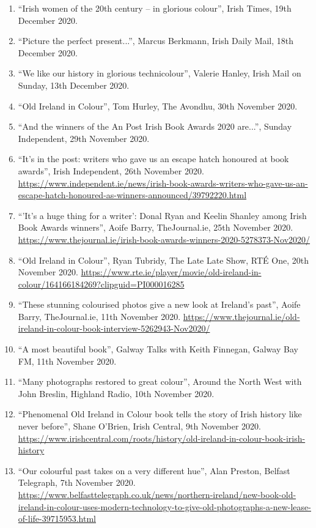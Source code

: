 \documentclass[10pt,a4paper]{res} %
\begin{document}
\begin{resume}
{\begin{enumerate}
\item ``Irish women of the 20th century – in glorious colour'', Irish Times, 19th December 2020.
\item ``Picture the perfect present...'', Marcus Berkmann, Irish Daily Mail, 18th December 2020.
\item ``We like our history in glorious technicolour'', Valerie Hanley, Irish Mail on Sunday, 13th December 2020.
\item ``Old Ireland in Colour'', Tom Hurley, The Avondhu, 30th November 2020.
\item ``And the winners of the An Post Irish Book Awards 2020 are...'', Sunday Independent, 29th November 2020.
\item ``It's in the post: writers who gave us an escape hatch honoured at book awards'', Irish Independent, 26th November 2020. \url{https://www.independent.ie/news/irish-book-awards-writers-who-gave-us-an-escape-hatch-honoured-as-winners-announced/39792220.html}
\item ``'It's a huge thing for a writer': Donal Ryan and Keelin Shanley among Irish Book Awards winners'', Aoife Barry, TheJournal.ie, 25th November 2020. \url{https://www.thejournal.ie/irish-book-awards-winners-2020-5278373-Nov2020/}
\item ``Old Ireland in Colour'', Ryan Tubridy, The Late Late Show, RT\'{E} One, 20th November 2020. \url{https://www.rte.ie/player/movie/old-ireland-in-colour/164166184269?clipguid=PI000016285}
\item ``These stunning colourised photos give a new look at Ireland's past'', Aoife Barry, TheJournal.ie, 11th November 2020. \url{https://www.thejournal.ie/old-ireland-in-colour-book-interview-5262943-Nov2020/}
\item ``A most beautiful book'', Galway Talks with Keith Finnegan, Galway Bay FM, 11th November 2020.
\item ``Many photographs restored to great colour'', Around the North West with John Breslin, Highland Radio, 10th November 2020.
\item ``Phenomenal Old Ireland in Colour book tells the story of Irish history like never before'', Shane O'Brien, Irish Central, 9th November 2020. \url{https://www.irishcentral.com/roots/history/old-ireland-in-colour-book-irish-history}
\item ``Our colourful past takes on a very different hue'', Alan Preston, Belfast Telegraph, 7th November 2020. \url{https://www.belfasttelegraph.co.uk/news/northern-ireland/new-book-old-ireland-in-colour-uses-modern-technology-to-give-old-photographs-a-new-lease-of-life-39715953.html}

\end{enumerate}}
\end{resume}
\end{document}
